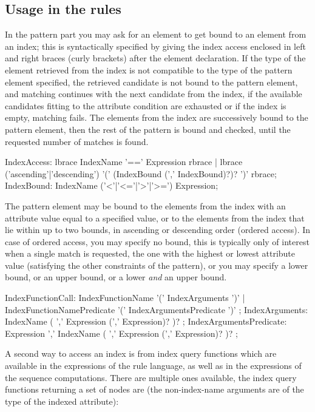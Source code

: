 \subsection*{Usage in the rules}\label{sub:indexusage}

In the pattern part you may ask for an element to get bound to an element from an index;
this is syntactically specified by giving the index access enclosed in left and right braces (curly brackets) after the element declaration.
If the type of the element retrieved from the index is not compatible to the type of the pattern element specified, the retrieved candidate is not bound to the pattern element, and matching continues with the next candidate from the index, if the available candidates fitting to the attribute condition are exhausted or if the index is empty, matching fails.
The elements from the index are successively bound to the pattern element, then the rest of the pattern is bound and checked, until the requested number of matches is found.

\begin{rail}
  IndexAccess:
    lbrace IndexName '==' Expression rbrace |
		lbrace ('ascending'|'descending') '(' (IndexBound (',' IndexBound)?)? ')' rbrace;
	IndexBound: IndexName ('<'|'<='|'>'|'>=') Expression;
\end{rail}

The pattern element may be bound to the elements from the index with an attribute value equal to a specified value,
or to the elements from the index that lie within up to two bounds, in ascending or descending order (ordered access).
In case of ordered access, you may specify no bound, this is typically only of interest when a single match is requested, the one with the highest or lowest attribute value (satisfying the other constraints of the pattern), or you may specify a lower bound, or an upper bound, or a lower \emph{and} an upper bound.

\begin{rail}
  IndexFunctionCall:
    IndexFunctionName '(' IndexArguments ')' |
    IndexFunctionNamePredicate '(' IndexArgumentsPredicate ')' ;
  IndexArguments: 
    IndexName ( ',' Expression (',' Expression)? )? ;
  IndexArgumentsPredicate: 
    Expression ',' IndexName ( ',' Expression (',' Expression)? )? ;
\end{rail}

A second way to access an index is from index query functions which are available in the expressions of the rule language, as well as in the expressions of the sequence computations.
There are multiple ones available, the index query functions returning a set of nodes are (the non-index-name arguments are of the type of the indexed attribute):

